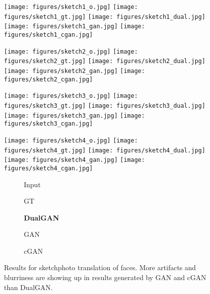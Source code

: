 \begin{figure}
\begin{center}
\texttt{[image: figures/sketch1\_o.jpg]}
\texttt{[image: figures/sketch1\_gt.jpg]}
\texttt{[image: figures/sketch1\_dual.jpg]}
\texttt{[image: figures/sketch1\_gan.jpg]}
\texttt{[image: figures/sketch1\_cgan.jpg]}

\texttt{[image: figures/sketch2\_o.jpg]}
\texttt{[image: figures/sketch2\_gt.jpg]}
\texttt{[image: figures/sketch2\_dual.jpg]}
\texttt{[image: figures/sketch2\_gan.jpg]}
\texttt{[image: figures/sketch2\_cgan.jpg]}

\texttt{[image: figures/sketch3\_o.jpg]}
\texttt{[image: figures/sketch3\_gt.jpg]}
\texttt{[image: figures/sketch3\_dual.jpg]}
\texttt{[image: figures/sketch3\_gan.jpg]}
\texttt{[image: figures/sketch3\_cgan.jpg]}

\texttt{[image: figures/sketch4\_o.jpg]}
\texttt{[image: figures/sketch4\_gt.jpg]}
\texttt{[image: figures/sketch4\_dual.jpg]}
\texttt{[image: figures/sketch4\_gan.jpg]}
\texttt{[image: figures/sketch4\_cgan.jpg]}

\begin{subfigure}[]{0.19\linewidth}\caption*{Input}\end{subfigure}
\begin{subfigure}[]{0.19\linewidth}\caption*{GT}\end{subfigure}
\begin{subfigure}[]{0.19\linewidth}\caption*{\textbf{DualGAN}}\end{subfigure}
\begin{subfigure}[]{0.19\linewidth}\caption*{GAN}\end{subfigure}
\begin{subfigure}[]{0.19\linewidth}\caption*{cGAN~\cite{isola2016image}}\end{subfigure}
\caption{Results for sketchphoto translation of faces. More 
artifacts and blurriness are showing up in results generated by GAN and cGAN than 
DualGAN.} \label{fig:sketch}
\end{center}
\end{figure}






